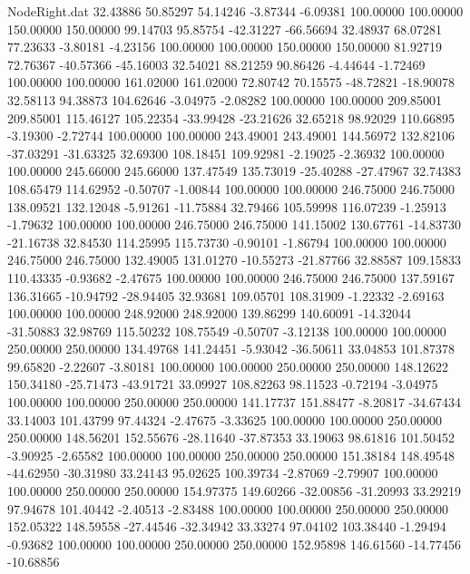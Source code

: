 \begin{filecontents}{NodeRight.dat}
  32.43886   50.85297   54.14246    -3.87344   -6.09381  100.00000  100.00000  150.00000  150.00000   99.14703   95.85754  -42.31227  -66.56694
  32.48937   68.07281   77.23633    -3.80181   -4.23156  100.00000  100.00000  150.00000  150.00000   81.92719   72.76367  -40.57366  -45.16003
  32.54021   88.21259   90.86426    -4.44644   -1.72469  100.00000  100.00000  161.02000  161.02000   72.80742   70.15575  -48.72821  -18.90078
  32.58113   94.38873  104.62646    -3.04975   -2.08282  100.00000  100.00000  209.85001  209.85001  115.46127  105.22354  -33.99428  -23.21626
  32.65218   98.92029  110.66895    -3.19300   -2.72744  100.00000  100.00000  243.49001  243.49001  144.56972  132.82106  -37.03291  -31.63325
  32.69300  108.18451  109.92981    -2.19025   -2.36932  100.00000  100.00000  245.66000  245.66000  137.47549  135.73019  -25.40288  -27.47967
  32.74383  108.65479  114.62952    -0.50707   -1.00844  100.00000  100.00000  246.75000  246.75000  138.09521  132.12048   -5.91261  -11.75884
  32.79466  105.59998  116.07239    -1.25913   -1.79632  100.00000  100.00000  246.75000  246.75000  141.15002  130.67761  -14.83730  -21.16738
  32.84530  114.25995  115.73730    -0.90101   -1.86794  100.00000  100.00000  246.75000  246.75000  132.49005  131.01270  -10.55273  -21.87766
  32.88587  109.15833  110.43335    -0.93682   -2.47675  100.00000  100.00000  246.75000  246.75000  137.59167  136.31665  -10.94792  -28.94405
  32.93681  109.05701  108.31909    -1.22332   -2.69163  100.00000  100.00000  248.92000  248.92000  139.86299  140.60091  -14.32044  -31.50883
  32.98769  115.50232  108.75549    -0.50707   -3.12138  100.00000  100.00000  250.00000  250.00000  134.49768  141.24451   -5.93042  -36.50611
  33.04853  101.87378   99.65820    -2.22607   -3.80181  100.00000  100.00000  250.00000  250.00000  148.12622  150.34180  -25.71473  -43.91721
  33.09927  108.82263   98.11523    -0.72194   -3.04975  100.00000  100.00000  250.00000  250.00000  141.17737  151.88477   -8.20817  -34.67434
  33.14003  101.43799   97.44324    -2.47675   -3.33625  100.00000  100.00000  250.00000  250.00000  148.56201  152.55676  -28.11640  -37.87353
  33.19063   98.61816  101.50452    -3.90925   -2.65582  100.00000  100.00000  250.00000  250.00000  151.38184  148.49548  -44.62950  -30.31980
  33.24143   95.02625  100.39734    -2.87069   -2.79907  100.00000  100.00000  250.00000  250.00000  154.97375  149.60266  -32.00856  -31.20993
  33.29219   97.94678  101.40442    -2.40513   -2.83488  100.00000  100.00000  250.00000  250.00000  152.05322  148.59558  -27.44546  -32.34942
  33.33274   97.04102  103.38440    -1.29494   -0.93682  100.00000  100.00000  250.00000  250.00000  152.95898  146.61560  -14.77456  -10.68856

\end{filecontents}
